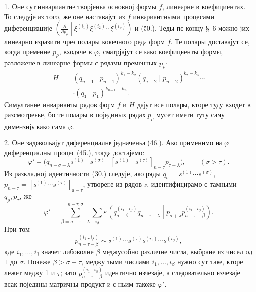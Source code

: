 ﻿\documentclass[11pt]{article}
\newcommand{\pair}[2]{\left(#1\middle|#2\right)}
\newcommand{\eps}{\varepsilon}
\begin{document}
1. Оне сут инвариантне творјеньа основној формы $f$, линеарне в коефициентах. То следује из того, же оне наставајут из $f$ инвариантными процесами диференциације
$\left(\frac{\partial}{\partial p_\rho}\middle|\xi^{(i_1)}\xi^{(i_2)}\cdots\xi^{(i_\rho)}\right)$ и (50.). Теды по концу \S\ 6 можно јих линеарно изразити чрез полары конечного реда форм $f$. Те полары доставајут се, когда пременне $p_\rho$, входяче в $\varphi$, сматрјајут се како коефициенты формы, разложене в линеарне формы с рядами пременных $p_\rho$:
\begin{equation}
\begin{aligned}
 H={}&(q_{n-1}\mid p_{n-1})^{k_1-k_2}
(q_{n-2}\mid p_{n-2})^{k_2-k_3}\cdots\\
&\cdot(q_1\mid p_1)^{k_{n-1}-k_n}.
\end{aligned}
\tag{52}
\end{equation}
Симултанне инварианты рядов форм $f$ и $H$ дајут все полары, кторе туду входет в разсмотренье, бо те полары в појединых рядах $p_\rho$ мусет имети туту саму димензију како сама $\varphi$.

2. Оне задовольајут диференциалне једначеньа (46.). Ако применимо на $\varphi$ диференциалны процес (45.), тогда достајемо:
\[
 \varphi'=\bigl(q_{n-\sigma-\lambda}s^{(1)}\cdots s^{(\sigma)}\mid [s^{(1)}\cdots s^{(\tau)}]_{n-\tau}p_{\tau-\lambda}\bigr),\qquad (\sigma>\tau).
\]
Из разкладној идентичности (30.) следује, ако ряды $q_\sigma=s^{(1)}\cdots s^{(\sigma)}$, $p_{n-\tau}=[s^{(1)}\cdots s^{(\tau)}]_{n-\tau}$, утворене из рядов $s$, идентифицирамо с тамными $q_\rho,p_\tau$, же
\[
 \varphi'=\sum_{\beta=\sigma-\tau+\lambda}^{n-\tau,\sigma}\sum_{i_\beta}\eps\,
 \pair{q_{\sigma-\beta}^{(i_1\ldots i_\beta)}q_{n-\tau+\lambda}}{p_{\sigma+\lambda}p_{n-\tau-\beta}^{(i_1\ldots i_\beta)}}.
\]
При том
\[
 p_{n-\tau-\beta}^{(i_1\ldots i_\beta)}\sim s^{(1)}\cdots s^{(\tau)}s^{(i_1)}\cdots s^{(i_\beta)},
\]
кде $i_1,\ldots,i_\beta$ значет либоволне $\beta$ меджусобно различне числа, выбране из чисел од 1 до $\sigma$. Понеже $\beta>\sigma-\tau$, меджу тыми числами $i_1,\ldots,i_\beta$ нужно сут таке, кторе лежет меджу 1 и $\tau$; зато $p_{n-\tau-\beta}^{(i_1\ldots i_\beta)}$ идентично изчезаје, а следовательно изчезаје всак поједины матричны продукт и с ньим такоже $\varphi'$.
\end{document}

